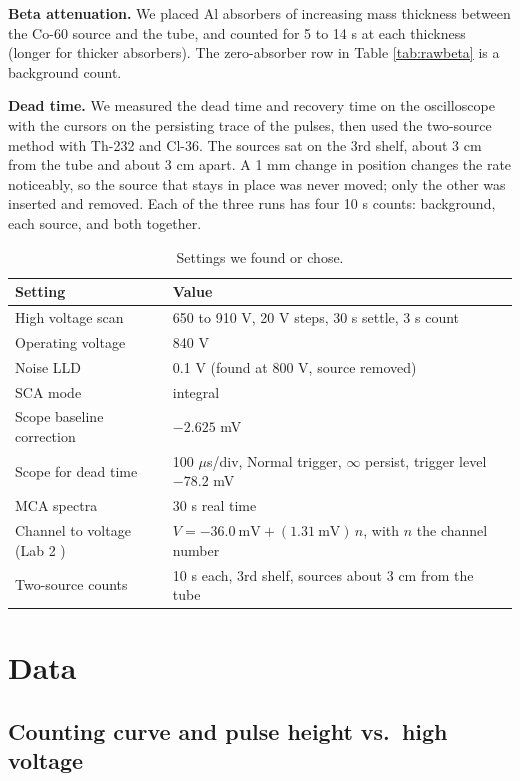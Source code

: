 \documentclass[12pt]{article}
\begin{document}
\textbf{Beta attenuation.} We placed Al absorbers of increasing mass thickness between the Co-60 source and the tube, and counted for 5 to 14 s at each thickness (longer for thicker absorbers). The zero-absorber row in Table \ref{tab:rawbeta} is a background count.

\textbf{Dead time.} We measured the dead time and recovery time on the oscilloscope with the cursors on the persisting trace of the pulses, then used the two-source method with Th-232 and Cl-36. The sources sat on the 3rd shelf, about 3 cm from the tube and about 3 cm apart. A 1 mm change in position changes the rate noticeably, so the source that stays in place was never moved; only the other was inserted and removed. Each of the three runs has four 10 s counts: background, each source, and both together.

\begin{table}[!htbp]
\centering\small
\begin{tabular}{ll}
\toprule
\textbf{Setting} & \textbf{Value} \\
\midrule
High voltage scan & 650 to 910 V, 20 V steps, 30 s settle, 3 s count \\
Operating voltage & 840 V \\
Noise LLD & 0.1 V (found at 800 V, source removed) \\
SCA mode & integral \\
Scope baseline correction & $-2.625$ mV \\
Scope for dead time & 100 $\mu$s/div, Normal trigger, $\infty$ persist, trigger level $-78.2$ mV \\
MCA spectra & 30 s real time \\
Channel to voltage (Lab 2 \cite{lab2}) & $V = -36.0\ \text{mV} + (1.31\ \text{mV})\,n$, with $n$ the channel number \\
Two-source counts & 10 s each, 3rd shelf, sources about 3 cm from the tube \\
\bottomrule
\end{tabular}
\caption{Settings we found or chose.}
\label{tab:settings}
\end{table}


\section{Data}

\subsection{Counting curve and pulse height vs.\ high voltage}
\end{document}
